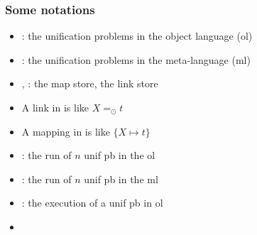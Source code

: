 \documentclass{pres}
\begin{document}
\begin{frame}
  \frametitle{Some notations}

  \begin{itemize}
    \item \foUnifPb: the unification problems in the object language (ol)
    \item \hoUnifPb: the unification problems in the meta-language (ml)
    \item \mapStore, \linkStore: the map store, the link store
    \item A link in \linkStore is like $X =_\odot t$
    \item A mapping in \mapStore is like $\{X \mapsto t\}$ 
  \end{itemize}

  \mysep

  \begin{itemize}
    \item {}: the run of $n$ unif pb in the ol
    \item {}: the run of $n$ unif pb in the ml
    \item {}: the execution of a unif pb in ol
    \item {}
  \end{itemize}


\end{frame}
\end{document}
